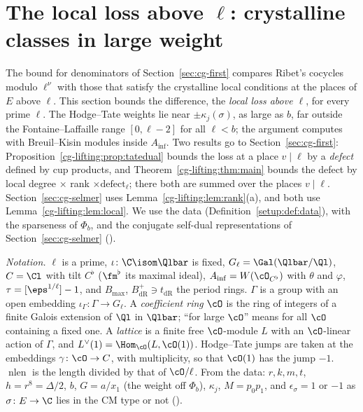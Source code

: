 \section{The local loss above \texorpdfstring{$\ell$}{l}: crystalline classes in large weight}
\label{sec:cg-lifting}

The bound for denominators of Section~\ref{sec:cg-first} compares Ribet's cocycles modulo $\ell^\nu$
with those that satisfy the crystalline local conditions at the places of $E$ above $\ell$. This
section bounds the difference, the \emph{local loss above $\ell$}, for every prime $\ell$. The
Hodge--Tate weights lie near $\pm\kappa_j(\sigma)$, as large as $b$, far outside the
Fontaine--Laffaille range $[0,\ell-2]$ for all $\ell<b$; the argument computes with
Breuil--Kisin modules inside $A_{\inf}$. Two results go to Section~\ref{sec:cg-first}:
Proposition~\ref{cg-lifting:prop:tatedual} bounds the
loss at a place $v\mid\ell$ by a \emph{defect} defined by cup products, and
Theorem~\ref{cg-lifting:thm:main} bounds the defect
by local degree $\times$ rank $\times\mathrm{defect}_\ell$; there both are summed over the
places $v\mid\ell$. Section~\ref{sec:cg-selmer} uses
Lemma~\ref{cg-lifting:lem:rank}(a), and both use Lemma~\ref{cg-lifting:lem:local}. We use the data
(Definition~\ref{setup:def:data}), with the sparseness of $\Phi_b$, and the conjugate self-dual
representations of Section~\ref{sec:cg-selmer} ().

\emph{Notation.} $\ell$ is a prime, $\iota\colon\C\isom\Qlbar$ is fixed, $G_\ell=\Gal(\Qlbar/\Ql)$,
$C=\Cl$ with tilt $C^\flat$ ($\fm^\flat$ its maximal ideal), $A_{\inf}=W(\cO_{C^\flat})$ with $\theta$
and $\varphi$, $\tau=[\eps^{1/\ell}]-1$, and $B_{\max}$, $B_{\mathrm{dR}}^+\ni t_{\mathrm{dR}}$ the period rings. $\Gamma$ is a group with an open embedding
$\iota_\Gamma\colon\Gamma\to G_\ell$. A \emph{coefficient ring} $\cO$ is the ring of integers of a finite Galois
extension of $\Ql$ in $\Qlbar$; ``for large $\cO$'' means for all $\cO$ containing a fixed one. A
\emph{lattice} is a finite free $\cO$-module $L$ with an $\cO$-linear action of $\Gamma$, and
$L^\vee(1)=\Hom_\cO(L,\cO(1))$. Hodge--Tate jumps are taken at the embeddings $\gamma\colon\cO\to C$,
with multiplicity, so that $\cO(1)$ has the jump $-1$. $\operatorname{nlen}$ is the length divided
by that of $\cO/\ell$. From the data: $r,k,m,t$, $h=r^8=\Delta/2$, $b$, $G=a/x_1$ (the weight off
$\Phi_b$), $\kappa_j$, $M=p_0p_1$, and $\epsilon_\sigma=1$ or $-1$ as $\sigma\colon E\to\C$ lies in the CM type or not
().

